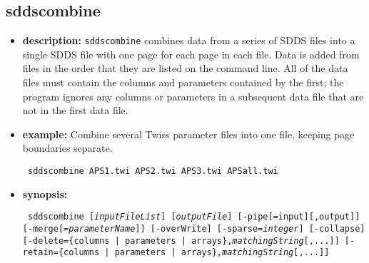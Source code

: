 \newpage
\subsection{sddscombine}
\label{sddscombine}

\begin{itemize}
\item {\bf description:}
\verb|sddscombine| combines data from a series of SDDS files into a single SDDS file with one page for each page in each file.  
Data is added from files in the order that they are listed on the command line.
All of the data files must contain the columns and parameters contained by the first; the program ignores
any columns or parameters in a subsequent data file that are not in the first data file.
\item {\bf example:}
Combine several Twiss parameter files into one file, keeping page boundaries separate.
\begin{flushleft}{\tt
sddscombine APS1.twi APS2.twi APS3.twi APSall.twi 
}\end{flushleft}

\item {\bf synopsis:} 
\begin{flushleft}{\tt
sddscombine [{\em inputFileList}] [{\em outputFile}] [-pipe[=input][,output]]
[-merge[={\em parameterName}]] [-overWrite] [-sparse={\em integer}] 
[-collapse]
[-delete=\{columns | parameters | arrays\},{\em matchingString}[,...]]
[-retain=\{columns | parameters | arrays\},{\em matchingString}[,...]]
}\end{flushleft}


\end{itemize}
